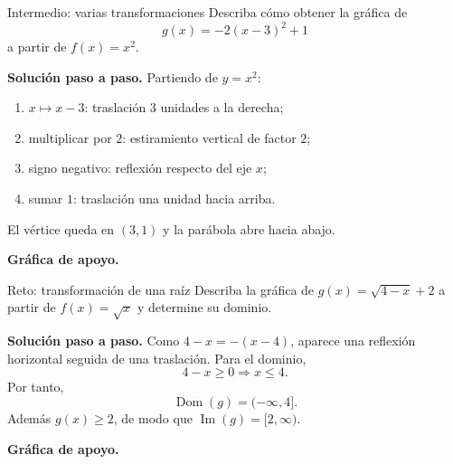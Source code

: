 \documentclass[aspectratio=169,10pt]{beamer}
\newcommand{\Dom}{\operatorname{Dom}}
\newcommand{\Ima}{\operatorname{Im}}
\begin{document}
\begin{frame}{Intermedio: varias transformaciones}
Describa cómo obtener la gráfica de
\[
g(x)=-2(x-3)^2+1
\]
a partir de $f(x)=x^2$.

\textbf{Solución paso a paso.} Partiendo de $y=x^2$:
\begin{enumerate}
\item $x\mapsto x-3$: traslación $3$ unidades a la derecha;
\item multiplicar por $2$: estiramiento vertical de factor $2$;
\item signo negativo: reflexión respecto del eje $x$;
\item sumar $1$: traslación una unidad hacia arriba.
\end{enumerate}
El vértice queda en $(3,1)$ y la parábola abre hacia abajo.


\textbf{Gráfica de apoyo.}\medskip
\begin{center}
\end{center}

\end{frame}

\begin{frame}{Reto: transformación de una raíz}
Describa la gráfica de $g(x)=\sqrt{4-x}+2$ a partir de $f(x)=\sqrt{x}$ y determine su dominio.

\textbf{Solución paso a paso.} Como $4-x=-(x-4)$, aparece una reflexión horizontal seguida de una traslación. Para el dominio,
\[
4-x\ge0\Longrightarrow x\le4.
\]
Por tanto,
\[
\boxed{\Dom(g)=(-\infty,4]}.
\]
Además $g(x)\ge2$, de modo que $\Ima(g)=[2,\infty)$.


\textbf{Gráfica de apoyo.}\medskip
\begin{center}
\end{center}

\end{frame}
\end{document}
